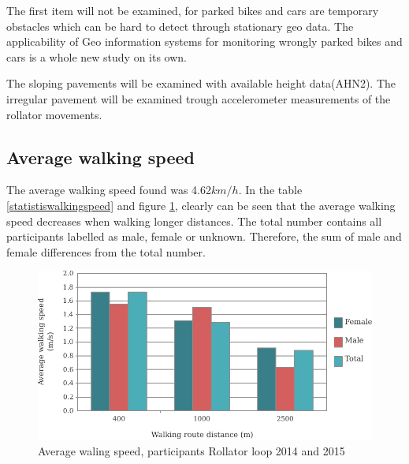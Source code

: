 The first item will not be examined, for parked bikes and cars are temporary obstacles which can be hard to detect through stationary geo data. The applicability of Geo information systems for monitoring wrongly parked bikes and cars is a whole new study on its own.

The sloping pavements will be examined with available height data(AHN2). The irregular pavement will be examined trough accelerometer measurements of the rollator movements. 

\clearpage

\subsection{Average walking speed}
The average walking speed found was 4.62$km/h$. In the table \ref{statistiswalkingspeed} and figure \ref{averagewalkingspeed}, clearly can be seen that the average walking speed decreases when walking longer distances. 
The total number contains all participants labelled as male, female or unknown. Therefore, the sum of male and female differences from the total number.

\begin{figure}[h]
\includegraphics[width=\textwidth]{img/R_averageWalkingSpeed.pdf}
\centering
\caption{Average waling speed, participants Rollator loop 2014 and 2015 \label{averagewalkingspeed}}
\end{figure}


